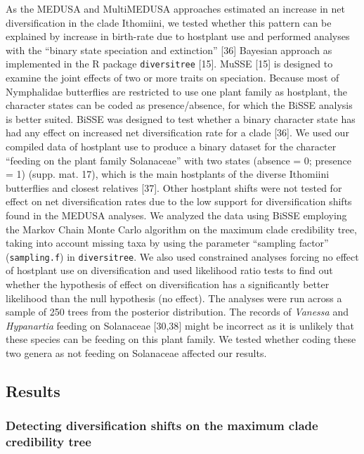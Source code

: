 \documentclass[10pt]{article}
\begin{document}
As the MEDUSA and MultiMEDUSA approaches estimated an increase in net
diversification in the clade Ithomiini, we tested whether this pattern
can be explained by increase in birth-rate due to hostplant use and
performed analyses with the ``binary state speciation and extinction''
{[}36{]} Bayesian approach as implemented in the R package
\texttt{diversitree} {[}15{]}. MuSSE {[}15{]} is designed to examine the
joint effects of two or more traits on speciation. Because most of
Nymphalidae butterflies are restricted to use one plant family as
hostplant, the character states can be coded as presence/absence, for
which the BiSSE analysis is better suited. BiSSE was designed to test
whether a binary character state has had any effect on increased net
diversification rate for a clade {[}36{]}. We used our compiled data of
hostplant use to produce a binary dataset for the character ``feeding on
the plant family Solanaceae'' with two states (absence = 0; presence =
1) (supp. mat. 17), which is the main hostplants of the diverse
Ithomiini butterflies and closest relatives {[}37{]}. Other hostplant
shifts were not tested for effect on net diversification rates due to
the low support for diversification shifts found in the MEDUSA analyses.
We analyzed the data using BiSSE employing the Markov Chain Monte Carlo
algorithm on the maximum clade credibility tree, taking into account
missing taxa by using the parameter ``sampling factor''
(\texttt{sampling.f}) in \texttt{diversitree}. We also used constrained
analyses forcing no effect of hostplant use on diversification and used
likelihood ratio tests to find out whether the hypothesis of effect on
diversification has a significantly better likelihood than the null
hypothesis (no effect). The analyses were run across a sample of 250
trees from the posterior distribution. The records of \emph{Vanessa} and
\emph{Hypanartia} feeding on Solanaceae {[}30,38{]} might be incorrect
as it is unlikely that these species can be feeding on this plant
family. We tested whether coding these two genera as not feeding on
Solanaceae affected our results.

\subsection{Results}\label{results}

\subsubsection{Detecting diversification shifts on the maximum clade
credibility
tree}\label{detecting-diversification-shifts-on-the-maximum-clade-credibility-tree}
\end{document}
